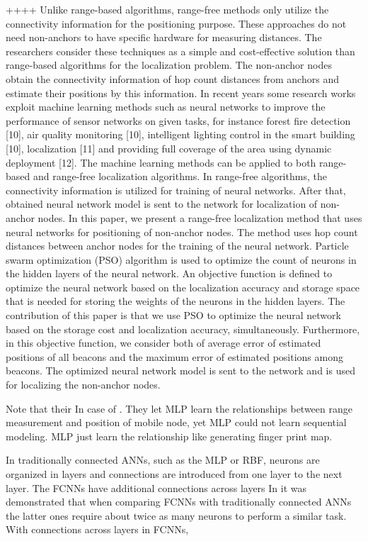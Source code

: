 \documentclass{ieeeaccess}
\begin{document}
++++
Unlike range-based algorithms, range-free methods only utilize the connectivity
information for the positioning purpose. These approaches do not need non-anchors to
have specific hardware for measuring distances. The researchers consider these techniques
as a simple and cost-effective solution than range-based algorithms for the localization
problem. The non-anchor nodes obtain the connectivity information of hop count distances
from anchors and estimate their positions by this information. In recent years some
research works exploit machine learning methods such as neural networks to improve the
performance of sensor networks on given tasks, for instance forest fire detection [10], air
quality monitoring [10], intelligent lighting control in the smart building [10], localization
[11] and providing full coverage of the area using dynamic deployment [12]. The machine
learning methods can be applied to both range-based and range-free localization algorithms. In range-free algorithms, the connectivity information is utilized for training of
neural networks. After that, obtained neural network model is sent to the network for
localization of non-anchor nodes. In this paper, we present a range-free localization method that uses neural networks for
positioning of non-anchor nodes. The method uses hop count distances between anchor
nodes for the training of the neural network. Particle swarm optimization (PSO) algorithm
is used to optimize the count of neurons in the hidden layers of the neural network. An
objective function is defined to optimize the neural network based on the localization
accuracy and storage space that is needed for storing the weights of the neurons in the
hidden layers. The contribution of this paper is that we use PSO to optimize the neural
network based on the storage cost and localization accuracy, simultaneously. Furthermore,
in this objective function, we consider both of average error of estimated positions of all
beacons and the maximum error of estimated positions among beacons. The optimized
neural network model is sent to the network and is used for localizing the non-anchor
nodes.




Note that their In case of \cite{shareef2008localization}. They let MLP learn the relationships between range measurement and position of mobile node, yet MLP could not learn sequential modeling. MLP just learn the relationship like generating finger print map. 

In traditionally connected ANNs, such as the MLP or
RBF, neurons are organized in layers and connections are
introduced from one layer to the next layer. The FCNNs
have additional connections across layers
In \cite{jain2010data} it was
demonstrated that when comparing FCNNs with traditionally connected ANNs the latter ones require about twice as
many neurons to perform a similar task. With connections
across layers in FCNNs,
\end{document}
